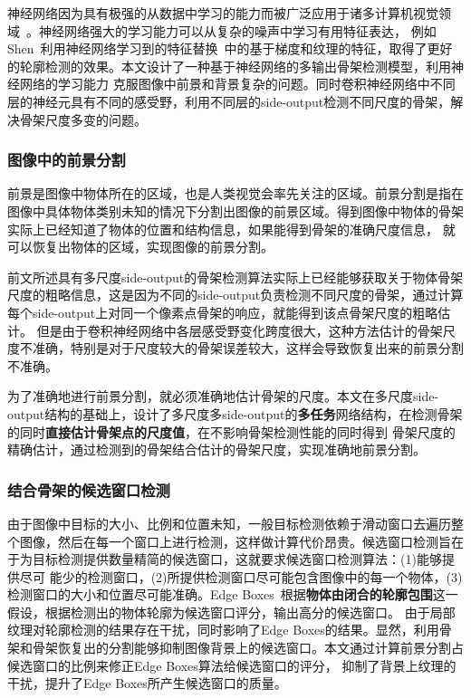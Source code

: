 \documentclass[UTF8]{ctexart}
\numberwithin{equation}{section} %
\numberwithin{table}{section} %
\begin{document}
神经网络因为具有极强的从数据中学习的能力而被广泛应用于诸多计算机视觉领域~\cite{krizhevsky2012imagenet, newell2016stacked,zhang2014panda,long2015fully}。神经网络强大的学习能力可以从复杂的噪声中学习有用特征表达，
例如Shen~\cite{shen2015deepcontour}利用神经网络学习到的特征替换~\cite{dollar2015fast}中的基于梯度和纹理的特征，取得了更好的轮廓检测的效果。本文设计了一种基于神经网络的多输出骨架检测模型，利用神经网络的学习能力
克服图像中前景和背景复杂的问题。同时卷积神经网络中不同层的神经元具有不同的感受野，利用不同层的side-output检测不同尺度的骨架，解决骨架尺度多变的问题。

\subsubsection{图像中的前景分割}
前景是图像中物体所在的区域，也是人类视觉会率先关注的区域。前景分割是指在图像中具体物体类别未知的情况下分割出图像的前景区域。得到图像中物体的骨架实际上已经知道了物体的位置和结构信息，如果能得到骨架的准确尺度信息，
就可以恢复出物体的区域，实现图像的前景分割。

前文所述具有多尺度side-output的骨架检测算法实际上已经能够获取关于物体骨架尺度的粗略信息，这是因为不同的side-output负责检测不同尺度的骨架，通过计算每个side-output上对同一个像素点骨架的响应，就能得到该点骨架尺度的粗略估计。
但是由于卷积神经网络中各层感受野变化跨度很大，这种方法估计的骨架尺度不准确，特别是对于尺度较大的骨架误差较大，这样会导致恢复出来的前景分割不准确。

为了准确地进行前景分割，就必须准确地估计骨架的尺度。本文在多尺度side-output结构的基础上，设计了多尺度多side-output的\textbf{多任务}网络结构，在检测骨架的同时\textbf{直接估计骨架点的尺度值}，在不影响骨架检测性能的同时得到
骨架尺度的精确估计，通过检测到的骨架结合估计的骨架尺度，实现准确地前景分割。

\subsubsection{结合骨架的候选窗口检测}
由于图像中目标的大小、比例和位置未知，一般目标检测依赖于滑动窗口去遍历整个图像，然后在每一个窗口上进行检测，这样做计算代价昂贵。候选窗口检测旨在于为目标检测提供数量精简的候选窗口，这就要求候选窗口检测算法：(1)能够提供尽可
能少的检测窗口，(2)所提供检测窗口尽可能包含图像中的每一个物体，(3)检测窗口的大小和位置尽可能准确。Edge Boxes~\cite{zitnick2014edge}根据\textbf{物体由闭合的轮廓包围}这一假设，根据检测出的物体轮廓为候选窗口评分，输出高分的候选窗口。
由于局部纹理对轮廓检测的结果存在干扰，同时影响了Edge Boxes的结果。显然，利用骨架和骨架恢复出的分割能够抑制图像背景上的候选窗口。本文通过计算前景分割占候选窗口的比例来修正Edge Boxes算法给候选窗口的评分，
抑制了背景上纹理的干扰，提升了Edge Boxes所产生候选窗口的质量。
\end{document}
